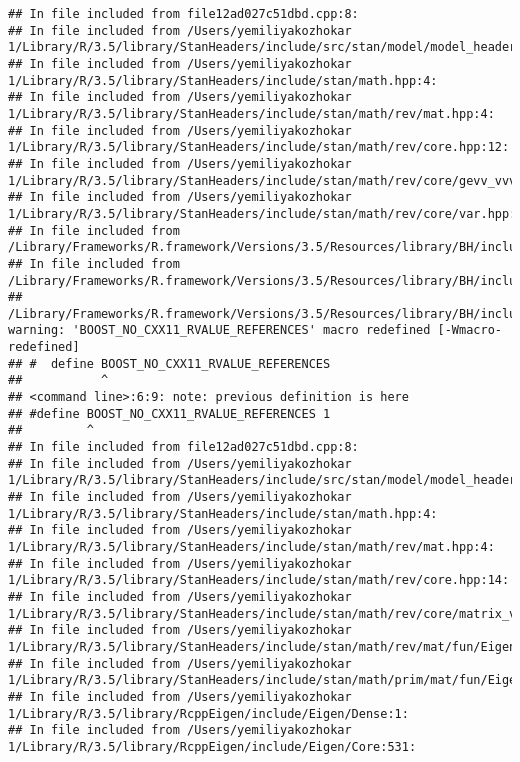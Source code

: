 \documentclass[]{article}
\begin{document}
\begin{verbatim}
## In file included from file12ad027c51dbd.cpp:8:
## In file included from /Users/yemiliyakozhokar 1/Library/R/3.5/library/StanHeaders/include/src/stan/model/model_header.hpp:4:
## In file included from /Users/yemiliyakozhokar 1/Library/R/3.5/library/StanHeaders/include/stan/math.hpp:4:
## In file included from /Users/yemiliyakozhokar 1/Library/R/3.5/library/StanHeaders/include/stan/math/rev/mat.hpp:4:
## In file included from /Users/yemiliyakozhokar 1/Library/R/3.5/library/StanHeaders/include/stan/math/rev/core.hpp:12:
## In file included from /Users/yemiliyakozhokar 1/Library/R/3.5/library/StanHeaders/include/stan/math/rev/core/gevv_vvv_vari.hpp:5:
## In file included from /Users/yemiliyakozhokar 1/Library/R/3.5/library/StanHeaders/include/stan/math/rev/core/var.hpp:7:
## In file included from /Library/Frameworks/R.framework/Versions/3.5/Resources/library/BH/include/boost/math/tools/config.hpp:13:
## In file included from /Library/Frameworks/R.framework/Versions/3.5/Resources/library/BH/include/boost/config.hpp:39:
## /Library/Frameworks/R.framework/Versions/3.5/Resources/library/BH/include/boost/config/compiler/clang.hpp:200:11: warning: 'BOOST_NO_CXX11_RVALUE_REFERENCES' macro redefined [-Wmacro-redefined]
## #  define BOOST_NO_CXX11_RVALUE_REFERENCES
##           ^
## <command line>:6:9: note: previous definition is here
## #define BOOST_NO_CXX11_RVALUE_REFERENCES 1
##         ^
## In file included from file12ad027c51dbd.cpp:8:
## In file included from /Users/yemiliyakozhokar 1/Library/R/3.5/library/StanHeaders/include/src/stan/model/model_header.hpp:4:
## In file included from /Users/yemiliyakozhokar 1/Library/R/3.5/library/StanHeaders/include/stan/math.hpp:4:
## In file included from /Users/yemiliyakozhokar 1/Library/R/3.5/library/StanHeaders/include/stan/math/rev/mat.hpp:4:
## In file included from /Users/yemiliyakozhokar 1/Library/R/3.5/library/StanHeaders/include/stan/math/rev/core.hpp:14:
## In file included from /Users/yemiliyakozhokar 1/Library/R/3.5/library/StanHeaders/include/stan/math/rev/core/matrix_vari.hpp:4:
## In file included from /Users/yemiliyakozhokar 1/Library/R/3.5/library/StanHeaders/include/stan/math/rev/mat/fun/Eigen_NumTraits.hpp:4:
## In file included from /Users/yemiliyakozhokar 1/Library/R/3.5/library/StanHeaders/include/stan/math/prim/mat/fun/Eigen.hpp:4:
## In file included from /Users/yemiliyakozhokar 1/Library/R/3.5/library/RcppEigen/include/Eigen/Dense:1:
## In file included from /Users/yemiliyakozhokar 1/Library/R/3.5/library/RcppEigen/include/Eigen/Core:531:

\end{verbatim}
\end{document}
